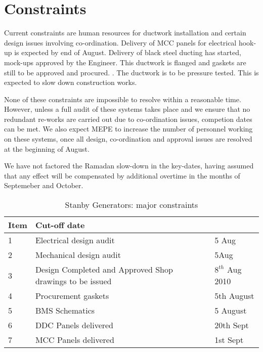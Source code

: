 \section{Constraints}

Current constraints are human resources for ductwork installation and certain design issues involving co-ordination. Delivery of MCC panels for electrical hook-up is expected by end of August. Delivery of black steel ducting has started, mock-ups approved by the Engineer. This ductwork is flanged and gaskets are still to be approved and procured. . The ductwork is to be pressure tested. This is expected to slow down construction works. 

None of these constraints are impossible to resolve within a reasonable time. However, unless a full audit of these systems takes place  and we ensure that no redundant re-works are carried out due to co-ordination issues, competion dates can be met. We also expect MEPE to increase the number of personnel working on these systems, once all design, co-ordination and approval issues are resolved at the beginning of August. 

We have not factored the Ramadan slow-down in the key-dates, having assumed that any effect will be compensated by additional overtime in the months of Septemeber and October. 


           \begin{table}[htbp] 
	    \begin{tabular}{l p{4cm}l}
	      \toprule
	     Item & Cut-off date  \\
	      \midrule
                  1 &Electrical design audit & 5 Aug\\
                  2 &Mechanical design audit &5Aug \\
	      3  &Design Completed and Approved Shop drawings to be issued             &  $8^{th}$ Aug 2010  \\
                  4  &Procurement gaskets & 5th August\\
                  5  &BMS Schematics & 5 August \\
                  6  &DDC Panels delivered & 20th Sept \\
                  7  &MCC Panels delivered & 1st Sept\\
	      \bottomrule
	    \end{tabular}
           \caption{Stanby Generators:  major constraints}
            \end{table}



